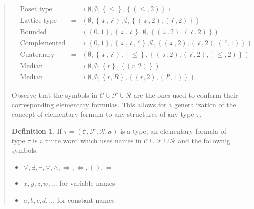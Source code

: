 \documentclass[a4paper, 12pt]{article}
\theoremstyle{definition}
\theoremstyle{definition}
\theoremstyle{definition}
\newtheorem{definition}{Definition}
\begin{document}
\begin{quote}
\begin{align*}
    &\text{Poset type} &= &\left( \emptyset, \emptyset, \left\{ \leq \right\}, \left\{ (\leq, 2) \right\}   \right) \\
    &\text{Lattice type} &= &\left( \emptyset, \left\{ ~\mathcal{s}~, ~\mathcal{i}~ \right\} ,\emptyset, \left\{ (~\mathcal{s}~, 2), (~\mathcal{i}~, 2) \right\}   \right)  \\ 
    &\text{Bounded lattice type} &= &\left( \left\{ 0, 1 \right\} , \left\{ ~\mathcal{s}~, ~\mathcal{i}~ \right\} ,\emptyset, \left\{ (~\mathcal{s}~, 2), (~\mathcal{i}~, 2) \right\}   \right)  \\ 
    &\text{Complemented lattice type} &= &\left( \left\{ 0, 1 \right\} , \left\{ ~\mathcal{s}~, ~\mathcal{i}~, ~^c \right\} ,\emptyset, \left\{ (~\mathcal{s}~, 2), (~\mathcal{i}~, 2), (~^c, 1) \right\}   \right)  \\ 
    &\text{Cuaternary lattice type} &= &\left( \emptyset , \left\{ ~\mathcal{s}~, ~\mathcal{i}~ \right\}, \left\{ \leq \right\},  \left\{ (~\mathcal{s}~, 2), (~\mathcal{i}~, 2), (\leq, 2) \right\}   \right)  \\ 
    &\text{Median algebra type} &= &\left( \emptyset, \emptyset, \left\{ r \right\}, \left\{ (r, 2) \right\}   \right) \\
    &\text{Median algebra type} &= &\left( \emptyset, \emptyset, \left\{ r, R \right\}, \left\{ (r, 2), (R, 1) \right\}   \right) 
\end{align*}

Observe that the symbols in $\mathcal{C} \cup \mathcal{F} \cup \mathcal{R}$ are the 
ones used to conform their corresponding elementary 
formulas. This allows for a generalization of the concept 
of elementary formula to any structures of any type $\tau$. 

\begin{definition}
    If $\tau = (\mathcal{C}, \mathcal{F}, \mathcal{R}, \mathcal{a})$ is a type, 
    an elementary formula of type $\tau$ is a finite 
    word which uses names in $\mathcal{C} \cup  \mathcal{F} \cup  \mathcal{R}$
    and the follownig symbols: 

    \begin{itemize}
        \item $\forall , \exists , \neg, \lor ,\land , \Rightarrow, \iff, (), =$
        \item $x, y, z, w, \ldots$ for variable names 
        \item $a, b, c, d, \ldots$ for constant names
    \end{itemize}
\end{definition}


\end{quote}
\end{document}
